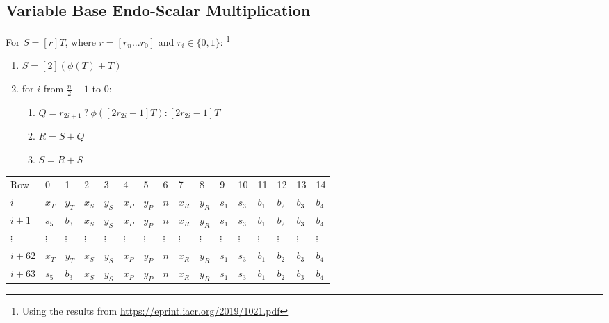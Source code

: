 \subsection{Variable Base Endo-Scalar Multiplication}

For $S  = [r]T$, where $r = [r_n ... r_0]$ and $r_i \in \{0, 1\}$:
\footnote{Using the results from \url{https://eprint.iacr.org/2019/1021.pdf}}
\begin{enumerate}
	\item $S = [2](\phi(T) + T)$
	\item for $i$ from $\frac{n}{2} - 1$ to $0$:
	\begin{enumerate}
		\item $Q = r_{2i + 1} \: ? \: \phi([2r_{2i} - 1]T) : [2r_{2i} - 1]T$
		\item $R = S + Q$
		\item $S = R + S$
	\end{enumerate}
\end{enumerate}

\begin{center}
\begin{table}[H]
\begin{tabular}{llllllllllllllll}
 Row 		& 0 & 1 & 2 & 3 & 4 & 5 & 6 & 7 & 8 & 9 & 10 & 11 & 12 & 13 & 14 \\
 $i$ 			& $x_T$ & $y_T$ & $x_S$ & $y_S$ & $x_P$ & $y_P$ & $n$ & $x_R$ & $y_R$ & $s_1$ & $s_3$ & $b_1$ & $b_2$ & $b_3$ & $b_4$ \\
 $i + 1$	& $s_5$ & $b_3$ & $x_S$ & $y_S$ & $x_P$ & $y_P$ & $n$ & $x_R$ & $y_R$ & $s_1$ & $s_3$ & $b_1$ & $b_2$ & $b_3$ & $b_4$ \\
 $\vdots$	& $\vdots$ & $\vdots$ & $\vdots$ & $\vdots$ & $\vdots$ & $\vdots$ & $\vdots$ & $\vdots$ & $\vdots$ & $\vdots$ & $\vdots$ & $\vdots$ & $\vdots$ & $\vdots$ & $\vdots$ \\
 $i + 62$	& $x_T$ & $y_T$ & $x_S$ & $y_S$ & $x_P$ & $y_P$ & $n$ & $x_R$ & $y_R$ & $s_1$ & $s_3$ & $b_1$ & $b_2$ & $b_3$ & $b_4$ \\
 $i + 63$	& $s_5$ & $b_3$ & $x_S$ & $y_S$ & $x_P$ & $y_P$ & $n$ & $x_R$ & $y_R$ & $s_1$ & $s_3$ & $b_1$ & $b_2$ & $b_3$ & $b_4$ \\
\end{tabular}
\end{table}
\end{center}

